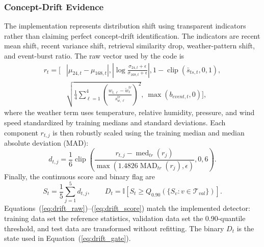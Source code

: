 \subsubsection{Concept-Drift Evidence}
The implementation represents distribution shift using transparent indicators
rather than claiming perfect concept-drift identification. The indicators are
recent mean shift, recent variance shift, retrieval similarity drop,
weather-pattern shift, and event-burst ratio. The raw vector used by the code is
\begin{equation}
\begin{aligned}
r_t=\bigg[&|\mu_{24,t}-\mu_{168,t}|,
\left|\log\frac{\sigma_{24,t}+\epsilon}{\sigma_{168,t}+\epsilon}\right|,
1-\operatorname{clip}(\bar{s}_{ts,t},0,1),\\
&\sqrt{\frac{1}{4}\sum_{\ell=1}^{4}
\left(\frac{w_{t,\ell}-\widetilde{w}^{tr}_{\ell}}
{s^{tr}_{w,\ell}}\right)^2},\ \max(b_{event,t},0)\bigg],
\end{aligned}
\label{eq:drift_raw}
\end{equation}
where the weather term uses temperature, relative humidity, pressure, and wind
speed standardized by training medians and standard deviations. Each component
$r_{t,j}$ is then robustly scaled using the training median and median absolute
deviation (MAD):
\begin{equation}
d_{t,j}=\frac{1}{6}\operatorname{clip}\left(
\frac{r_{t,j}-\operatorname{med}_{tr}(r_j)}
{\max(1.4826\operatorname{MAD}_{tr}(r_j),\epsilon)},0,6\right).
\label{eq:drift_scale}
\end{equation}
Finally, the continuous score and binary flag are
\begin{equation}
S_t=\frac{1}{5}\sum_{j=1}^{5}d_{t,j},\qquad
D_t=\mathbb{I}\!\left[S_t\geq
Q_{0.90}\!\left(\{S_v:v\in\mathcal{T}_{val}\}\right)\right].
\label{eq:drift_score}
\end{equation}
Equations~(\ref{eq:drift_raw})--(\ref{eq:drift_score}) match the implemented
detector: training data set the reference statistics, validation data set the
0.90-quantile threshold, and test data are transformed without refitting. The
binary $D_t$ is the state used in Equation~(\ref{eq:drift_gate}).

